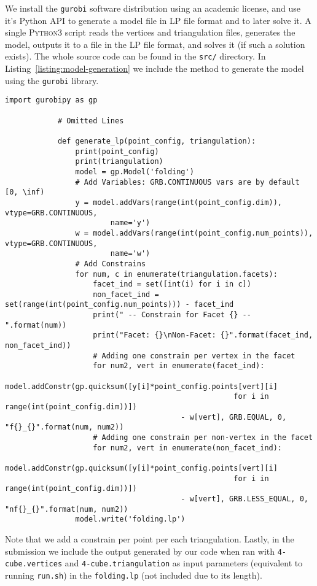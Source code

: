 \begin{enumerate}
    We install the \texttt{gurobi} software distribution using an academic license, and use it's Python API to generate a model file in LP file format and to later solve it.
    A single \textsc{Python3} script reads the vertices and triangulation files, generates the model, outputs it to a file in the LP file format, and solves it (if such a solution exists).
    The whole source code can be found in the \texttt{src/} directory.
    In Listing~\ref{listing:model-generation} we include the method to generate the model using the \texttt{gurobi} library.
        \begin{lstlisting}[style=python,caption={Code to generate the set of folding conditions given a point configuration and a triangulation.\label{listing:model-generation}}]
            import gurobipy as gp

            # Omitted Lines

            def generate_lp(point_config, triangulation):
                print(point_config)
                print(triangulation)
                model = gp.Model('folding')
                # Add Variables: GRB.CONTINUOUS vars are by default [0, \inf)
                y = model.addVars(range(int(point_config.dim)), vtype=GRB.CONTINUOUS,
                        name='y')
                w = model.addVars(range(int(point_config.num_points)), vtype=GRB.CONTINUOUS,
                        name='w')
                # Add Constrains
                for num, c in enumerate(triangulation.facets):
                    facet_ind = set([int(i) for i in c])
                    non_facet_ind = set(range(int(point_config.num_points))) - facet_ind 
                    print(" -- Constrain for Facet {} -- ".format(num))
                    print("Facet: {}\nNon-Facet: {}".format(facet_ind, non_facet_ind))
                    # Adding one constrain per vertex in the facet
                    for num2, vert in enumerate(facet_ind):
                        model.addConstr(gp.quicksum([y[i]*point_config.points[vert][i] 
                                                    for i in range(int(point_config.dim))])
                                        - w[vert], GRB.EQUAL, 0, "f{}_{}".format(num, num2))
                    # Adding one constrain per non-vertex in the facet
                    for num2, vert in enumerate(non_facet_ind):
                        model.addConstr(gp.quicksum([y[i]*point_config.points[vert][i] 
                                                    for i in range(int(point_config.dim))])
                                        - w[vert], GRB.LESS_EQUAL, 0, "nf{}_{}".format(num, num2))
                model.write('folding.lp')
        \end{lstlisting}
        Note that we add a constrain per point per each triangulation.
        Lastly, in the submission we include the output generated by our code when ran with \texttt{4-cube.vertices} and \texttt{4-cube.triangulation} as input parameters (equivalent to running \texttt{run.sh}) in the \texttt{folding.lp} (not included due to its length).


\end{enumerate}
